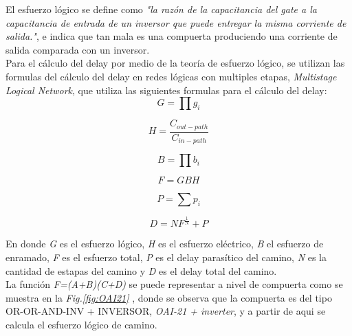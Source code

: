 \documentclass[12pt,a4paper]{article} %
\begin{document}
El esfuerzo lógico se define como \textit{"la razón de la capacitancia del gate a la capacitancia de entrada de un inversor que puede entregar la misma corriente de salida."}, e indica que tan mala es una compuerta produciendo una corriente de salida comparada con un inversor.\\

Para el cálculo del delay por medio de la teoría de esfuerzo lógico, se utilizan las formulas del cálculo del delay en redes lógicas con multiples etapas, \textit{Multistage Logical Network}, que utiliza las siguientes formulas para el cálculo del delay:\\

\begin{equation}\label{eqn:esfuerzo_logico}
G= \prod g_{i}
\end{equation}

\begin{equation}\label{eqn:esfuerzo_electrico}
H= \frac{C_{out-path}}{C_{in-path}}
\end{equation}

\begin{equation}\label{eqn:esfuerzo_enramado}
B= \prod b_{i}
\end{equation}

\begin{equation}\label{eqn:esfuerzo}
F = GBH
\end{equation}

\begin{equation}\label{eqn:delay_parasitico}
P = \sum p_{i}
\end{equation}

\begin{equation}\label{eqn:delay}
D = NF^{\frac{1}{N}} + P
\end{equation}

En donde \textit{G} es el esfuerzo lógico, \textit{H} es el esfuerzo eléctrico, \textit{B} el esfuerzo de enramado, \textit{F} es el esfuerzo total, \textit{P} es el delay parasítico del camino, \textit{N} es la cantidad de estapas del camino y \textit{D} es el delay total del camino.\\

La función \textit{F=(A+B)(C+D)} se puede representar a nivel de compuerta como se muestra en la \textit{Fig.\ref{fig:OAI21}} , donde se observa que la compuerta es del tipo OR-OR-AND-INV + INVERSOR, \textit{OAI-21 + inverter}, y a partir de aqui se calcula el esfuerzo lógico de camino.\\
\end{document}
